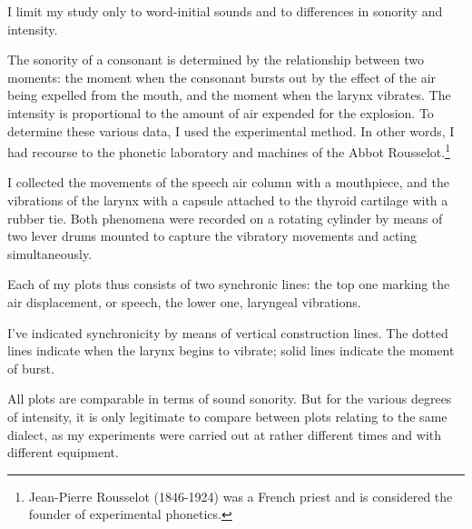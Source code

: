 I limit my study only to word-initial sounds and to differences in sonority and intensity.

The sonority of a consonant is determined by the relationship between two moments: the moment when the consonant bursts out by the effect of the air being expelled from the mouth, and the moment when the larynx vibrates. The intensity is proportional to the amount of air expended for the explosion. To determine these various data, I used the experimental method. In other words, I had recourse to the phonetic laboratory and machines of the Abbot Rousselot.\footnote{Jean-Pierre Rousselot (1846-1924) was a French priest and is considered the founder of experimental phonetics.}

I collected the movements of the speech air column with a mouthpiece, and the vibrations of the larynx with a capsule attached to the thyroid cartilage with a rubber tie. Both phenomena were recorded on a rotating cylinder by means of two lever drums mounted to capture the vibratory movements and acting simultaneously.

Each of my plots thus consists of two synchronic lines: the top one marking the air displacement, or speech, the lower one, laryngeal vibrations.

I've indicated synchronicity by means of vertical construction lines. The dotted lines indicate when the larynx begins to vibrate; solid lines indicate the moment of burst.

All plots are comparable in terms of sound sonority. But for the various degrees of intensity, it is only legitimate to compare between plots relating to the same dialect, as my experiments were carried out at rather different times and with different equipment.




